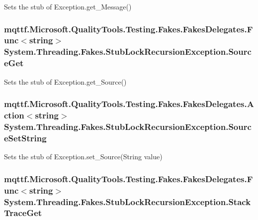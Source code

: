 Sets the stub of Exception.\-get\-\_\-\-Message()

\hypertarget{class_system_1_1_threading_1_1_fakes_1_1_stub_lock_recursion_exception_aa5fdfa4177ba5a2f36a26c95f2a10459}{
\subsubsection[{Source\-Get}]{\setlength{\rightskip}{0pt plus 5cm}mqttf.\-Microsoft.\-Quality\-Tools.\-Testing.\-Fakes.\-Fakes\-Delegates.\-Func$<$string$>$ System.\-Threading.\-Fakes.\-Stub\-Lock\-Recursion\-Exception.\-Source\-Get}}\label{class_system_1_1_threading_1_1_fakes_1_1_stub_lock_recursion_exception_aa5fdfa4177ba5a2f36a26c95f2a10459}


Sets the stub of Exception.\-get\-\_\-\-Source()

\hypertarget{class_system_1_1_threading_1_1_fakes_1_1_stub_lock_recursion_exception_a10d5557b89c5d0496a1d7e41d601e51d}{
\subsubsection[{Source\-Set\-String}]{\setlength{\rightskip}{0pt plus 5cm}mqttf.\-Microsoft.\-Quality\-Tools.\-Testing.\-Fakes.\-Fakes\-Delegates.\-Action$<$string$>$ System.\-Threading.\-Fakes.\-Stub\-Lock\-Recursion\-Exception.\-Source\-Set\-String}}\label{class_system_1_1_threading_1_1_fakes_1_1_stub_lock_recursion_exception_a10d5557b89c5d0496a1d7e41d601e51d}


Sets the stub of Exception.\-set\-\_\-\-Source(\-String value)

\hypertarget{class_system_1_1_threading_1_1_fakes_1_1_stub_lock_recursion_exception_a9a3bbda90634607cbe0b3808eb7d1b1e}{
\subsubsection[{Stack\-Trace\-Get}]{\setlength{\rightskip}{0pt plus 5cm}mqttf.\-Microsoft.\-Quality\-Tools.\-Testing.\-Fakes.\-Fakes\-Delegates.\-Func$<$string$>$ System.\-Threading.\-Fakes.\-Stub\-Lock\-Recursion\-Exception.\-Stack\-Trace\-Get}}\label{class_system_1_1_threading_1_1_fakes_1_1_stub_lock_recursion_exception_a9a3bbda90634607cbe0b3808eb7d1b1e}


